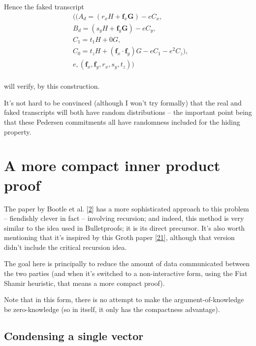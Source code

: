 \documentclass[10pt,a4paper]{article}
\begin{document}
Hence the faked transcript
\begin{align*}
& ((A_d = \left(r_x H + \textbf{f}_x \textbf{G} \right) -eC_x, \\
& B_d = \left(s_y H + \textbf{f}_y \textbf{G}\right) - eC_y,  \\
& C_1 = t_1 H + 0G, \\
& C_0 = t_z H + \left(\textbf{f}_x \cdot \textbf{f}_y \right)G -eC_1 - e^2 C_z ), \\
& e, (\textbf{f}_x, \textbf{f}_y, r_x, s_y, t_z)) \\
\end{align*}

will verify, by this construction.

It's not hard to be convinced (although I won't try formally) that the
real and faked transcripts will both have random distributions -- the
important point being that these Pedersen commitments all have
randomness included for the hiding property.

\hypertarget{a-more-compact-inner-product-proof}{%
\section[A more compact inner product
proof]{\texorpdfstring{\protect\hypertarget{anchor-41}{}{}A more compact
inner product
proof}{A more compact inner product proof}}\label{a-more-compact-inner-product-proof}}

The paper by Bootle et al. {[}\protect\hyperlink{anchor-8}{2}{]} has a
more sophisticated approach to this problem -- fiendishly clever in fact
-- involving recursion; and indeed, this method is very similar to the
idea used in Bulletproofs; it is its direct precursor. It's also worth
mentioning that it's inspired by this Groth paper
{[}\protect\hyperlink{anchor-42}{21}{]}, although that version didn't
include the critical recursion idea.

The goal here is principally to reduce the amount of data communicated
between the two parties (and when it's switched to a non-interactive
form, using the Fiat Shamir heuristic, that means a more compact proof).

Note that in this form, there is no attempt to make the
argument-of-knowledge be zero-knowledge (so in itself, it only has the
compactness advantage).

\hypertarget{condensing-a-single-vector}{%
\subsection[Condensing a single
vector]{\texorpdfstring{\protect\hypertarget{anchor-43}{}{}Condensing a
single
vector}{Condensing a single vector}}\label{condensing-a-single-vector}}
\end{document}

